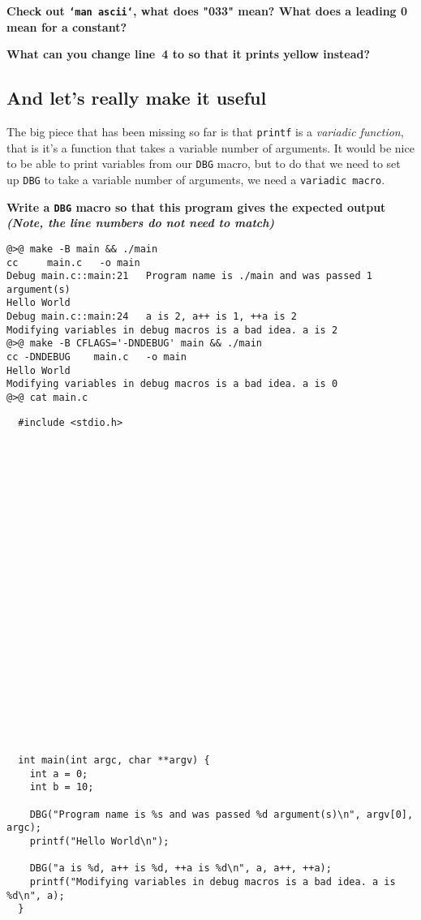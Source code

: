 \documentclass{article}
\begin{document}
\textbf{Check out \texttt{`man ascii`}, what does "033" mean?
  What does a leading 0 mean for a constant?}
\vspace{2cm}

\textbf{What can you change line~4 to so that it prints yellow instead?}



\newpage
\subsection{And let's really make it useful}

The big piece that has been missing so far is that \texttt{printf} is a
\emph{variadic function}, that is it's a function that takes a variable
number of arguments. It would be nice to be able to print variables from our
\texttt{DBG} macro, but to do that we need to set up \texttt{DBG} to take a
variable number of arguments, we need a \texttt{variadic macro}.

\textbf{Write a \texttt{DBG} macro so that this program gives the expected output\\
  \emph{\small(Note, the line numbers do not need to match)}}

\begin{lstlisting}
@>@ make -B main && ./main
cc     main.c   -o main
Debug main.c::main:21	Program name is ./main and was passed 1 argument(s)
Hello World
Debug main.c::main:24	a is 2, a++ is 1, ++a is 2
Modifying variables in debug macros is a bad idea. a is 2
@>@ make -B CFLAGS='-DNDEBUG' main && ./main
cc -DNDEBUG    main.c   -o main
Hello World
Modifying variables in debug macros is a bad idea. a is 0
@>@ cat main.c
\end{lstlisting}

\begin{lstlisting}
  #include <stdio.h>
























  int main(int argc, char **argv) {
    int a = 0;
    int b = 10;

    DBG("Program name is %s and was passed %d argument(s)\n", argv[0], argc);
    printf("Hello World\n");

    DBG("a is %d, a++ is %d, ++a is %d\n", a, a++, ++a);
    printf("Modifying variables in debug macros is a bad idea. a is %d\n", a);
  }
\end{lstlisting}
\end{document}
